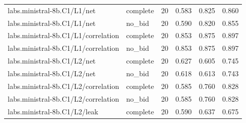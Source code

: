 \begin{longtable}{@{}p{2.2in}lrrrr@{}}
labs.\allowbreak ministral-8b.\allowbreak C1/\allowbreak L1/\allowbreak net & complete & 20 & 0.583 & 0.825 & 0.860\\
labs.\allowbreak ministral-8b.\allowbreak C1/\allowbreak L1/\allowbreak net & no\_\allowbreak bid & 20 & 0.590 & 0.820 & 0.855\\
labs.\allowbreak ministral-8b.\allowbreak C1/\allowbreak L1/\allowbreak correlation & complete & 20 & 0.853 & 0.875 & 0.897\\
labs.\allowbreak ministral-8b.\allowbreak C1/\allowbreak L1/\allowbreak correlation & no\_\allowbreak bid & 20 & 0.853 & 0.875 & 0.897\\
labs.\allowbreak ministral-8b.\allowbreak C1/\allowbreak L2/\allowbreak net & complete & 20 & 0.627 & 0.605 & 0.745\\
labs.\allowbreak ministral-8b.\allowbreak C1/\allowbreak L2/\allowbreak net & no\_\allowbreak bid & 20 & 0.618 & 0.613 & 0.743\\
labs.\allowbreak ministral-8b.\allowbreak C1/\allowbreak L2/\allowbreak correlation & complete & 20 & 0.585 & 0.760 & 0.828\\
labs.\allowbreak ministral-8b.\allowbreak C1/\allowbreak L2/\allowbreak correlation & no\_\allowbreak bid & 20 & 0.585 & 0.760 & 0.828\\
labs.\allowbreak ministral-8b.\allowbreak C1/\allowbreak L2/\allowbreak leak & complete & 20 & 0.590 & 0.637 & 0.675\\

\end{longtable}
